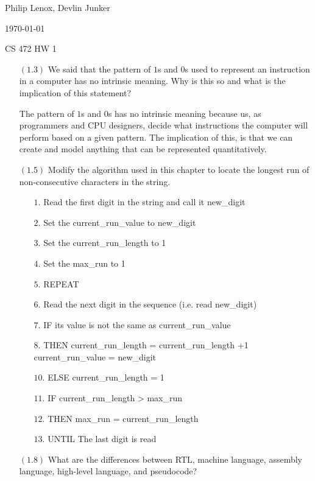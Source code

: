 \documentclass[letterpaper,10pt,titlepage]{article}
\def\name{Philip Lenox, Devlin Junker}
\begin{document}
\hfill \name

\hfill \today

\hfill CS 472 HW 1

\begin{enumerate}



\item[$(1.3)$] We said that the pattern of $1$s and $0$s used to represent an instruction
  in a computer has no intrinsic meaning. Why is this so and what is the implication of
  this statement?

  The pattern of $1$s and $0$s has no intrinsic meaning because us, as programmers and CPU
  designers, decide what instructions the computer will perform based on a given pattern. The
  implication of this, is that we can create and model anything that can be represented
  quantitatively.
  
\item[$(1.5)$] Modify the algorithm used in this chapter to locate the longest run of
  non-consecutive characters in the string.

    \begin{enumerate}
        \item[$1.$] Read the first digit in the string and call it new\_digit
        \item[$2.$] Set the current\_run\_value to new\_digit
        \item[$3.$] Set the current\_run\_length to 1
        \item[$4.$] Set the max\_run to 1
        \item[$5.$] REPEAT
        \item[$6.$] Read the next digit in the sequence (i.e. read new\_digit)
        \item[$7.$] IF its value is not the same as current\_run\_value
        \item[$8.$] THEN {current\_run\_length = current\_run\_length +1
                          current\_run\_value = new\_digit}
        \item[$10.$] ELSE current\_run\_length = 1
        \item[$11.$] IF current\_run\_length > max\_run
        \item[$12.$] THEN max\_run = current\_run\_length
        \item[$13.$] UNTIL The last digit is read
    \end{enumerate}

  

\item[$(1.8)$] What are the differences between RTL, machine language, assembly language,
  high-level language, and pseudocode?
  

\end{enumerate}
\end{document}
